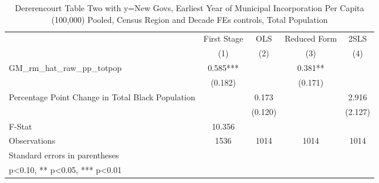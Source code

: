 \begin{table}[htbp]\centering
\def\sym#1{\ifmmode^{#1}\else\(^{#1}\)\fi}
\caption{Dererencourt Table Two with y=New Govs, Earliest Year of Municipal Incorporation Per Capita (100,000) Pooled, Census Region and Decade FEs controls, Total Population}
\begin{tabular}{l*{4}{c}}
\toprule
                    & First Stage   &         OLS   &Reduced Form   &        2SLS   \\
                    &\multicolumn{1}{c}{(1)}   &\multicolumn{1}{c}{(2)}   &\multicolumn{1}{c}{(3)}   &\multicolumn{1}{c}{(4)}   \\
\midrule
GM\_rm\_hat\_raw\_pp\_totpop&       0.585***&               &       0.381** &               \\
                    &     (0.182)   &               &     (0.171)   &               \\
\addlinespace
Percentage Point Change in Total Black Population&               &       0.173   &               &       2.916   \\
                    &               &     (0.120)   &               &     (2.127)   \\
\midrule
F-Stat              &      10.356   &               &               &               \\
Observations        &        1536   &        1014   &        1014   &        1014   \\
\bottomrule
\multicolumn{5}{l}{\footnotesize Standard errors in parentheses}\\
\multicolumn{5}{l}{\footnotesize * p<0.10, ** p<0.05, *** p<0.01}\\
\end{tabular}
\end{table}
